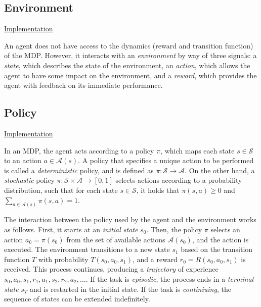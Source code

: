 \documentclass{article}
\newcommand{\GithubURL}[2]{
\noindent
\href{https://github.com/davidrobles/mlnd-capstone-code/blob/master/#1}{#2}
\break
}
\begin{document}
\subsection{Environment}

\GithubURL{capstone/rl/environment.py}{Implementation}

An agent does not have access to the dynamics (reward and transition function) of the MDP. However,
it interacts with an \emph{environment} by way of three signals: a \emph{state}, which describes the
state of the environment, an \emph{action}, which allows the agent to have some impact on the
environment, and a \emph{reward}, which provides the agent with feedback on its immediate
performance.

\subsection{Policy}

\GithubURL{capstone/policy/policy.py}{Implementation}

In an MDP, the agent acts according to a policy $\pi$, which maps each state $s \in \mathcal{S}$ to
an action $a \in \mathcal{A}(s)$. A policy that specifies a unique action to be performed is called
a \emph{deterministic} policy, and is defined as $\pi : \mathcal{S} \rightarrow \mathcal{A}$. On the
other hand, a \emph{stochastic} policy $\pi : \mathcal{S} \times \mathcal{A} \rightarrow [0,1]$
selects actions according to a probability distribution, such that for each state $s \in
\mathcal{S}$, it holds that $\pi(s,a) \geq 0$ and $\sum_{a\in\mathcal{A}(s)} \pi(s,a) = 1$.

The interaction between the policy used by the agent and the environment works as follows. First, it
starts at an \emph{initial state} $s_0$. Then, the policy $\pi$ selects an action $a_0 = \pi(s_0)$
from the set of available actions $\mathcal{A}(s_0)$, and the action is executed. The environment
transitions to a new state $s_1$ based on the transition function $T$ with probability
$T(s_0,a_0,s_1)$, and a reward $r_0 = R(s_0, a_0, s_1)$ is received. This process continues,
producing a \emph{trajectory} of experience $s_0, a_0, s_1, r_1, a_1, s_2, r_2, a_2, \dots$. If the
task is \emph{episodic}, the process ends in a \emph{terminal state} $s_T$ and is restarted in the
initial state. If the task is \emph{continiuing}, the sequence of states can be extended
indefinitely.
\end{document}
